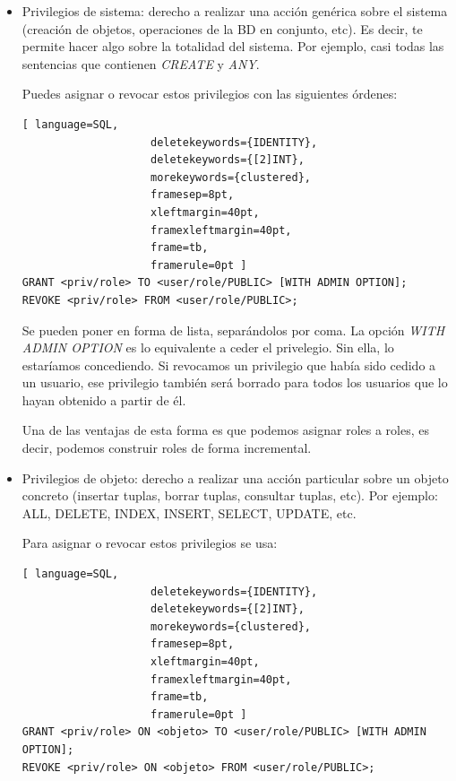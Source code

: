 \begin{itemize}
\item Privilegios de sistema: derecho a realizar una acción genérica sobre el sistema (creación de objetos, operaciones de la BD en conjunto, etc). Es decir, te permite hacer algo sobre la totalidad del sistema. Por ejemplo, casi todas las sentencias que contienen \textit{CREATE} y \textit{ANY}.

Puedes asignar o revocar estos privilegios con las siguientes órdenes:
\begin{lstlisting}[ language=SQL,
                    deletekeywords={IDENTITY},
                    deletekeywords={[2]INT},
                    morekeywords={clustered},
                    framesep=8pt,
                    xleftmargin=40pt,
                    framexleftmargin=40pt,
                    frame=tb,
                    framerule=0pt ]
GRANT <priv/role> TO <user/role/PUBLIC> [WITH ADMIN OPTION];
REVOKE <priv/role> FROM <user/role/PUBLIC>;
\end{lstlisting}
Se pueden poner en forma de lista, separándolos por coma. La opción \textit{WITH ADMIN OPTION} es lo equivalente a ceder el privelegio. Sin ella, lo estaríamos concediendo. Si revocamos un privilegio que había sido cedido a un usuario, ese privilegio también será borrado para todos los usuarios que lo hayan obtenido a partir de él. 

Una de las ventajas de esta forma es que podemos asignar roles a roles, es decir, podemos construir roles de forma incremental. 

\item Privilegios de objeto: derecho a realizar una acción particular sobre un objeto concreto (insertar tuplas,  borrar tuplas, consultar tuplas, etc). Por ejemplo: ALL, DELETE, INDEX, INSERT, SELECT, UPDATE, etc.

Para asignar o revocar estos privilegios se usa:
\begin{lstlisting}[ language=SQL,
                    deletekeywords={IDENTITY},
                    deletekeywords={[2]INT},
                    morekeywords={clustered},
                    framesep=8pt,
                    xleftmargin=40pt,
                    framexleftmargin=40pt,
                    frame=tb,
                    framerule=0pt ]
GRANT <priv/role> ON <objeto> TO <user/role/PUBLIC> [WITH ADMIN OPTION];
REVOKE <priv/role> ON <objeto> FROM <user/role/PUBLIC>;
\end{lstlisting}
\end{itemize}

